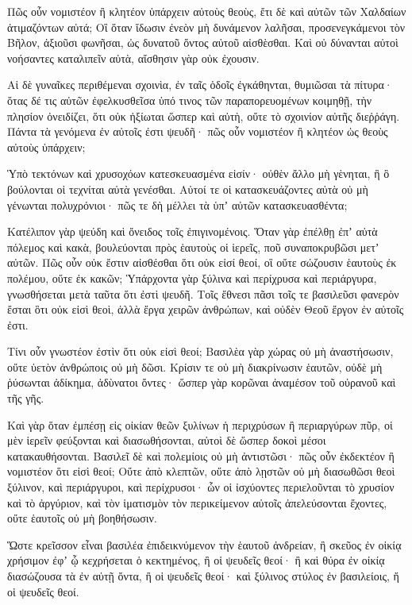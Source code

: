 {\par }{\PP {}Πῶς οὖν νομιστέον ἢ κλητέον ὑπάρχειν αὐτοὺς θεοὺς, ἔτι δὲ καὶ αὐτῶν τῶν Χαλδαίων ἀτιμαζόντων αὐτά;
Οἳ ὅταν ἴδωσιν ἐνεὸν μὴ δυνάμενον λαλῆσαι, προσενεγκάμενοι τὸν Βῆλον, ἀξιοῦσι φωνῆσαι, ὠς δυνατοῦ ὄντος αὐτοῦ αἰσθὲσθαι.
Καὶ οὐ δύνανται αὐτοὶ νοήσαντες καταλιπεῖν αὐτὰ, αἴσθησιν γὰρ οὐκ ἐχουσιν.
\par }{\PP {}Αἱ δὲ γυναῖκες περιθέμεναι σχοινὶα, ἐν ταῖς ὁδοῖς ἐγκάθηνται, θυμιῶσαι τὰ πίτυρα· ὅτας δέ τις αὐτῶν ἐφελκυσθεῖσα ὑπό τινος τῶν παραπορευομένων κοιμηθῇ, τὴν πλησίον ὀνειδίζει, ὅτι οὐκ ἠξίωται ὥσπερ καὶ αὐτὴ, οὔτε τὸ σχοινίον αὐτῆς διεῤῥάγη.
Πάντα τὰ γενόμενα ἐν αὐτοῖς ἐστι ψευδῆ· πῶς οὖν νομιστέον ἢ κλητέον ὡς θεοὺς αὐτοὺς ὑπάρχειν;
\par }{\PP {}Ὑπὸ τεκτόνων καὶ χρυσοχόων κατεσκευασμένα εἰσίν· οὐθὲν ἄλλο μὴ γὲνηται, ἢ ὃ βούλονται οἱ τεχνίται αὐτὰ γενέσθαι.
Αὐτοί τε οἱ κατασκευάζοντες αὐτὰ οὐ μὴ γένωνται πολυχρόνιοι· πῶς τε δὴ μέλλει τὰ ὑπʼ αὐτῶν κατασκευασθέντα;
\par }{\PP {}Κατέλιπον γὰρ ψεύδη καὶ ὄνειδος τοῖς ἐπιγινομένοις.
Ὅταν γὰρ ἐπέλθῃ ἐπʼ αὐτὰ πόλεμος καὶ κακὰ, βουλεύονται πρὸς ἑαυτοὺς οἱ ἱερεῖς, ποῦ συναποκρυβῶσι μετʼ αὐτῶν.
Πῶς οὖν οὐκ ἔστιν αἰσθέσθαι ὅτι οὐκ εἰσί θεοί, οἳ οὔτε σώζουσιν ἑαυτοὺς ἐκ πολέμου, οὔτε ἐκ κακῶν;
Ὑπάρχοντα γὰρ ξύλινα καὶ περίχρυσα καὶ περιάργυρα, γνωσθήσεται μετὰ ταῦτα ὅτι ἐστὶ ψευδῆ.
Τοῖς ἔθνεσι πᾶσι τοῖς τε βασιλεῦσι φανερὸν ἔσται ὃτι οὐκ εἰσὶ θεοὶ, ἀλλὰ ἔργα χειρῶν ἀνθρώπων, καὶ οὐδὲν Θεοῦ ἔργον ἐν αὐτοῖς ἐστι.
\par }{\PP {}Τίνι οὖν γνωστέον ἐστὶν ὅτι οὐκ εἰσὶ θεοί;
Βασιλὲα γὰρ χώρας οὐ μὴ ἀναστήσωσιν, οὔτε ὑετὸν ἀνθρώποις οὐ μὴ δῶσι.
Κρίσιν τε οὐ μὴ διακρίνωσιν ἑαυτῶν, οὐδὲ μὴ ῥύσωνται ἀδίκημα, ἀδὺνατοι ὄντες· ὥσπερ γὰρ κορῶναι ἀναμέσον τοῦ οὐρανοῦ καὶ τῆς γῆς.
\par }{\PP {}Καὶ γὰρ ὅταν ἐμπέσῃ εἰς οἰκίαν θεῶν ξυλίνων ἡ περιχρύσων ἢ περιαργύρων πῦρ, οἱ μὲν ἱερεῖν φεύξονται καὶ διασωθήσονται, αὐτοὶ δὲ ὥσπερ δοκοὶ μέσοι κατακαυθήσονται.
Βασιλεῖ δὲ καὶ πολεμίοις οὐ μὴ ἀντιστῶσι· πῶς οὖν ἐκδεκτέον ἢ νομιστέον ὅτι εἰσὶ θεοί;
Οὔτε ἀπὸ κλεπτῶν, οὔτε ἀπὸ λῃστῶν οὐ μὴ διασωθῶσι θεοὶ ξύλινον, καὶ περιάργυροι, καὶ περίχρυσοι·
ὧν οἱ ἰσχύοντες περιελοῦνται τὸ χρυσίον καὶ τὸ ἀργύριον, καὶ τὸν ἱματισμὸν τὸν περικείμενον αὐτοῖς ἀπελεύσονται ἔχοντες, οὔτε ἑαυτοῖς οὐ μὴ βοηθήσωσιν.
\par }{\PP {}Ὥστε κρεῖσσον εἶναι βασιλέα ἐπιδεικνύμενον τὴν ἑαυτοῦ ἀνδρείαν, ἢ σκεῦος ἐν οἰκίᾳ χρήσιμον ἐφʼ ᾧ κεχρήσεται ὁ κεκτημένος, ἢ οἱ ψευδεῖς θεοί· ἢ καὶ θύρα ἐν οἰκίᾳ διασώζουσα τὰ ἐν αὐτῇ ὄντα, ἢ οἱ ψευδεῖς θεοί· καὶ ξύλινος στύλος ἐν βασιλείοις, ἤ οἱ ψευδεῖς θεοί.
}
